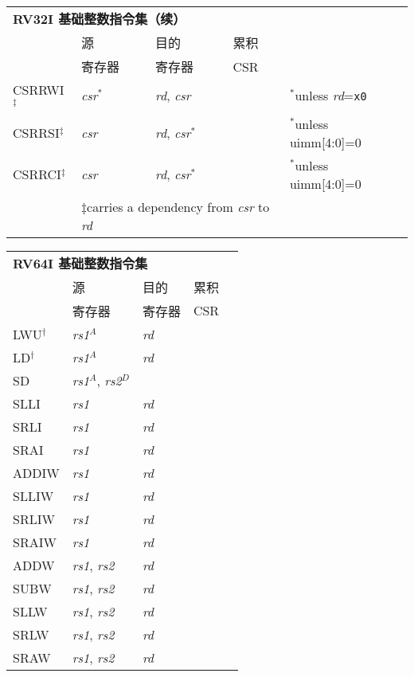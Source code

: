 \begin{tabular}{p{3cm}|p{3cm}|p{2cm}|p{4cm}|p{4cm}}
  \multicolumn{4}{l}{\bf RV32I 基础整数指令集（续）} \\
  \cline{2-4}
    & 源    & 目的 & 累积 \\
    & 寄存器 & 寄存器   & CSR \\
   \cline{2-4}
   CSRRWI$^\ddagger$ & {\em csr}$^*$ & {\em rd}, {\em csr} & & $^*$unless {\em rd}={\tt x0} \\
   \cline{2-4}
   CSRRSI$^\ddagger$ & {\em csr} & {\em rd}, {\em csr}$^*$ & & $^*$unless uimm[4:0]=0  \\
   \cline{2-4}
   CSRRCI$^\ddagger$ & {\em csr} & {\em rd}, {\em csr}$^*$ & & $^*$unless uimm[4:0]=0  \\
   \cline{2-4}
   \multicolumn{1}{c}{} & \multicolumn{3}{l}{$\ddagger$carries a dependency from {\em csr} to {\em rd}}
\end{tabular}

\begin{tabular}{p{3cm}|p{3cm}|p{2cm}|p{4cm}|p{4cm}}
  \multicolumn{4}{l}{\bf RV64I 基础整数指令集} \\
  \cline{2-4}
    & 源    & 目的 & 累积 \\
    & 寄存器 & 寄存器   & CSR \\
  \cline{2-4}
   LWU$^\dagger$ & {\em rs1}$^A$ & {\em rd} &   & \\
   \cline{2-4}
   LD$^\dagger$ & {\em rs1}$^A$ & {\em rd} &   & \\
   \cline{2-4}
   SD & {\em rs1}$^A$, {\em rs2}$^D$ &  &   & \\
   \cline{2-4}
   SLLI & {\em rs1} & {\em rd} &   & \\
   \cline{2-4}
   SRLI & {\em rs1} & {\em rd} &   & \\
   \cline{2-4}
   SRAI & {\em rs1} & {\em rd} &   & \\
   \cline{2-4}
   ADDIW & {\em rs1} & {\em rd} &   & \\
   \cline{2-4}
   SLLIW & {\em rs1} & {\em rd} &   & \\
   \cline{2-4}
   SRLIW & {\em rs1} & {\em rd} &   & \\
   \cline{2-4}
   SRAIW & {\em rs1} & {\em rd} &   & \\
   \cline{2-4}
   ADDW & {\em rs1}, {\em rs2} & {\em rd} &   & \\
   \cline{2-4}
   SUBW & {\em rs1}, {\em rs2} & {\em rd} &   & \\
   \cline{2-4}
   SLLW & {\em rs1}, {\em rs2} & {\em rd} &   & \\
   \cline{2-4}
   SRLW & {\em rs1}, {\em rs2} & {\em rd} &   & \\
   \cline{2-4}
   SRAW & {\em rs1}, {\em rs2} & {\em rd} &   & \\
   \cline{2-4}
\end{tabular}


